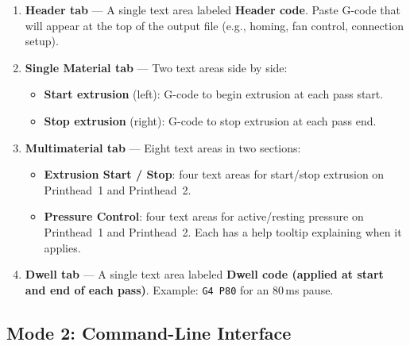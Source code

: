 \documentclass[11pt,letterpaper]{article}
\newcommand{\code}[1]{\texttt{#1}}
\newcommand{\gui}[1]{\textcolor{guicolor}{\textsf{\textbf{#1}}}}
\begin{document}
\begin{enumerate}
    \item \textbf{Header tab} --- A single text area labeled \gui{Header code}. Paste G-code that will appear at the top of the output file (e.g., homing, fan control, connection setup).

    \item \textbf{Single Material tab} --- Two text areas side by side:
    \begin{itemize}
        \item \gui{Start extrusion} (left): G-code to begin extrusion at each pass start.
        \item \gui{Stop extrusion} (right): G-code to stop extrusion at each pass end.
    \end{itemize}

    \item \textbf{Multimaterial tab} --- Eight text areas in two sections:
    \begin{itemize}
        \item \textbf{Extrusion Start / Stop}: four text areas for start/stop extrusion on Printhead~1 and Printhead~2.
        \item \textbf{Pressure Control}: four text areas for active/resting pressure on Printhead~1 and Printhead~2. Each has a help tooltip explaining when it applies.
    \end{itemize}

    \item \textbf{Dwell tab} --- A single text area labeled \gui{Dwell code (applied at start and end of each pass)}. Example: \code{G4 P80} for an 80\,ms pause.
\end{enumerate}

\subsection{Mode 2: Command-Line Interface}
\end{document}
